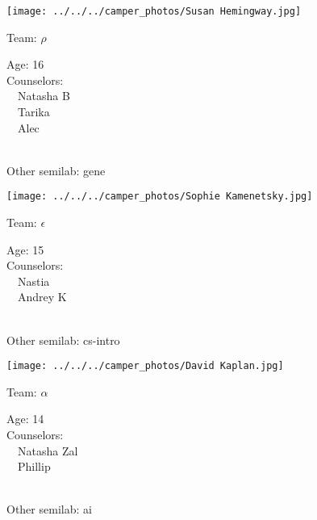 \documentclass[10pt,letterpaper, landscape]{article}
\begin{document}
\horizontalshiftfornextsticker
\renewcommand{\baselinestretch}{1} \begin{sticker}
\noindent\begin{minipage}{0.5\textwidth}\texttt{[image: ../../../camper\_photos/Susan Hemingway.jpg]}\end{minipage}\begin{minipage}{0.45\textwidth}
Team: {\Large $\rho$}

Age:        16\\
Counselors: \\\ \ Natasha B\\\ \ Tarika\\\ \ Alec\\
\end{minipage} \\ \vspace{0.07in}
Other semilab: gene
\end{sticker}
\horizontalshiftfornextsticker
\renewcommand{\baselinestretch}{1} \begin{sticker}
\noindent\begin{minipage}{0.5\textwidth}\texttt{[image: ../../../camper\_photos/Sophie Kamenetsky.jpg]}\end{minipage}\begin{minipage}{0.45\textwidth}
Team: {\Large $\epsilon$}

Age:        15\\
Counselors: \\\ \ Nastia\\\ \ Andrey K\\
\end{minipage} \\ \vspace{0.07in}
Other semilab: cs-intro
\end{sticker}
\verticalshiftfornextsticker
\renewcommand{\baselinestretch}{1} \begin{sticker}
\noindent\begin{minipage}{0.5\textwidth}\texttt{[image: ../../../camper\_photos/David Kaplan.jpg]}\end{minipage}\begin{minipage}{0.45\textwidth}
Team: {\Large $\alpha$}

Age:        14\\
Counselors: \\\ \ Natasha Zal\\\ \ Phillip\\
\end{minipage} \\ \vspace{0.07in}
Other semilab: ai
\end{sticker}
\end{document}
